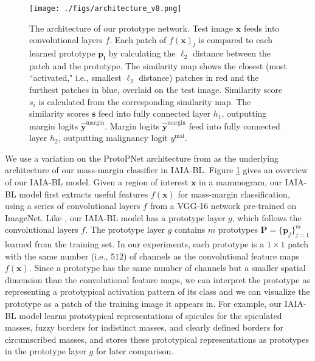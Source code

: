 \documentclass[11pt]{article}
\begin{document}
\begin{figure}[h]
        \begin{center}                        \texttt{[image: ./figs/architecture\_v8.png]}
        \end{center}
           \caption{The architecture of our prototype network. Test image $\textbf{x}$ feeds into convolutional layers $f$. Each patch of $f(\textbf{x})_l$ is compared to each learned prototype $\textbf{p}_\textbf{i}$ by calculating the $\ell_2$ distance between the patch and the prototype. The similarity map shows the closest (most ``activated," i.e., smallest $\ell_2$ distance) patches in red and the furthest patches in blue, overlaid on the test image. Similarity score $s_i$ is calculated from the corresponding similarity map. The similarity scores $\textbf{s}$ feed into fully connected layer $h_1$, outputting margin logits $\hat{\textbf{y}}^{\textrm{margin}}$. Margin logits $\hat{\textbf{y}}^{\textrm{margin}}$ feed into fully connected layer $h_2$, outputting malignancy logit ${y}^{\textrm{mal}}$.}
        \label{fig:architecture}
\end{figure}

We use a variation on the ProtoPNet architecture from \cite{PPNet} as the underlying architecture of our mass-margin classifier in IAIA-BL. 
Figure \ref{fig:architecture} gives an overview of our IAIA-BL model. Given a region of interest $\mathbf{x}$ in a mammogram, our IAIA-BL model first extracts useful features $f(\mathbf{x})$ for mass-margin classification, using a series of convolutional layers $f$ from a VGG-16 network \citep{simonyan2015very} pre-trained on ImageNet. Like \cite{PPNet}, our IAIA-BL model has a prototype layer $g$, which follows the convolutional layers $f$. The prototype layer $g$ contains $m$ prototypes $\mathbf{P}=\{\mathbf{p}_j\}_{j=1}^m$ learned from the training set. In our experiments, each prototype is a $1 \times 1$ patch with the same number (i.e., $512$) of channels as the convolutional feature maps $f(\mathbf{x})$. Since a prototype has the same number of channels but a smaller spatial dimension than the convolutional feature maps, we can interpret the prototype as representing a prototypical activation pattern of its class and we can visualize the prototype as a patch of the training image it appears in.
For example, our IAIA-BL model learns prototypical representations of spicules for the spiculated masses, fuzzy borders for indistinct masses, and clearly defined borders for circumscribed masses, and stores these prototypical representations as prototypes in the prototype layer $g$ for later comparison. 
\end{document}

